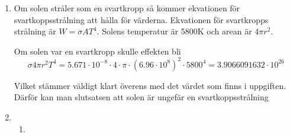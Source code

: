 \documentclass[a4paper,12pt]{article}
\begin{document}
\begin{enumerate}
    \item Om solen stråler som en svartkropp så kommer ekvationen för
          svartkoppsstrålning att hålla för värderna.
          Ekvationen för svartkropps strålning är $W=\sigma A T^4$.
          Solens temperatur är 5800K och arean är $4\pi r^2$.

          Om solen var en svartkropp skulle effekten bli
          $$\sigma 4\pi r^2T^4=5.671\cdot 10^{-8} \cdot 4 \cdot \pi \cdot (6.96\cdot 10^8)^2\cdot 5800^4=3.9066091632\cdot 10^{26}$$

          Vilket stämmer väldigt klart överens med det värdet som finns i uppgiften. Därför
          kan man slutsatsen att solen är ungefär en svartkoppsstrålning

    \item
          \begin{enumerate}
              \item
          \end{enumerate}


\end{enumerate}
\end{document}
